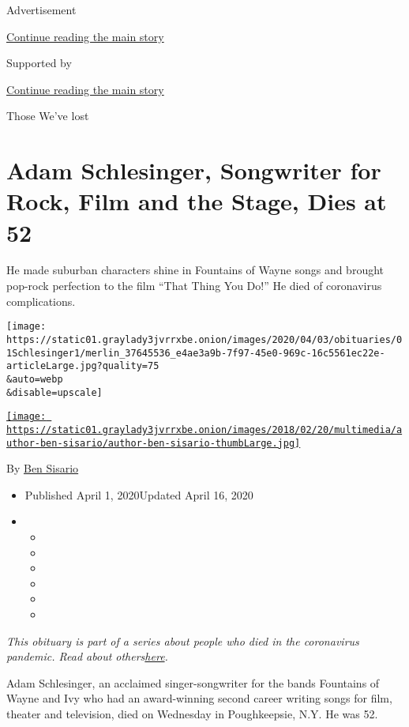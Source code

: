Advertisement

\protect\hyperlink{after-top}{Continue reading the main story}

Supported by

\protect\hyperlink{after-sponsor}{Continue reading the main story}

Those We've lost

\hypertarget{adam-schlesinger-songwriter-for-rock-film-and-the-stage-dies-at-52}{%
\section{Adam Schlesinger, Songwriter for Rock, Film and the Stage, Dies
at
52}\label{adam-schlesinger-songwriter-for-rock-film-and-the-stage-dies-at-52}}

He made suburban characters shine in Fountains of Wayne songs and
brought pop-rock perfection to the film ``That Thing You Do!'' He died
of coronavirus complications.

\texttt{[image: https://static01.graylady3jvrrxbe.onion/images/2020/04/03/obituaries/01Schlesinger1/merlin\_37645536\_e4ae3a9b-7f97-45e0-969c-16c5561ec22e-articleLarge.jpg?quality=75\\\&auto=webp\\\&disable=upscale]}

\href{https://www.nytimes3xbfgragh.onion/by/ben-sisario}{\texttt{[image: https://static01.graylady3jvrrxbe.onion/images/2018/02/20/multimedia/author-ben-sisario/author-ben-sisario-thumbLarge.jpg]}}

By \href{https://www.nytimes3xbfgragh.onion/by/ben-sisario}{Ben Sisario}

\begin{itemize}
\item
  Published April 1, 2020Updated April 16, 2020
\item
  \begin{itemize}
  \item
  \item
  \item
  \item
  \item
  \item
  \end{itemize}
\end{itemize}

\emph{This obituary is part of a series about people who died in the
coronavirus pandemic. Read about
others}\href{https://www.nytimes3xbfgragh.onion/series/people-who-have-died-of-the-coronavirus}{\emph{here}}\emph{.}

Adam Schlesinger, an acclaimed singer-songwriter for the bands Fountains
of Wayne and Ivy who had an award-winning second career writing songs
for film, theater and television, died on Wednesday in Poughkeepsie,
N.Y. He was 52.

